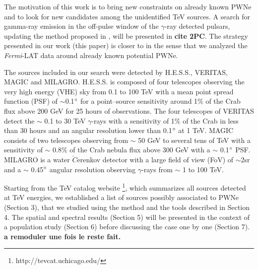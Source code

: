 The motivation of this work is to bring new constraints on already known PWNe and to look for new candidates among the unidentified TeV sources.  A search for gamma-ray emission in the off-pulse window of the $\gamma$-ray detected pulsars, updating the method proposed in \cite{2011ApJ...726...35A}, will be presented in \textbf{cite 2PC}. The strategy presented in our work (this paper) is closer to \cite{2010AA...518A...8T} in the sense that we analyzed the \emph{Fermi}-LAT data around already known potential PWNe.

The sources included in our search were detected by H.E.S.S., VERITAS, MAGIC and MILAGRO. H.E.S.S. \citep{2006AA...457..899A} is composed of four telescopes observing the very high energy (VHE) sky from 0.1 to 100 TeV with a mean point spread function (PSF) of $\sim$0.1$\mbox{$^\circ$}$ for a point--source sensitivity around 1$\%$ of the Crab flux above 200 GeV for 25 hours of observations. The four telescopes of VERITAS \citep{2002APh....17..221W} detect the $\sim$ 0.1 to 30 TeV $\gamma$-rays with a sensitivity of 1$\%$ of the Crab in less than 30 hours and an angular resolution lower than 0.1$\mbox{$^\circ$}$ at 1 TeV. MAGIC \citep{2012APh....35..435A} consists of two telescopes observing from $\sim$ 50 GeV to several tens of TeV with a sensitivity of $\sim$ 0.8$\%$ of the Crab nebula flux above 300 GeV with a $\sim$ 0.1$\mbox{$^\circ$}$ PSF. MILAGRO \citep{2007ApJ...658L..33A} is a water $\breve{C}$erenkov detector with a large field of view (FoV) of $\sim$2sr and a $\sim$ 0.45$\mbox{$^\circ$}$ angular resolution observing $\gamma$-rays from $\sim$ 1 to 100 TeV. 

%

Starting from the TeV catalog website \footnote{http://tevcat.uchicago.edu/}, which summarizes all sources detected at TeV energies, we established a list of sources possibly associated to PWNe (Section 3), that we studied using the method and the tools described in Section 4. The spatial and spectral results (Section 5) will be presented in the context of a population study (Section 6) before discussing the case one by one (Section 7). \textbf{a remoduler une fois le reste fait.} 